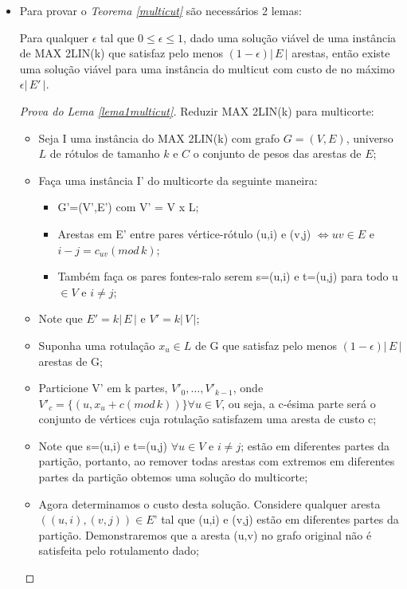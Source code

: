 \documentclass[12pt,a4paper]{article}
\begin{document}
\begin{itemize}
     \item Para provar o \emph{Teorema \ref{multicut}} são necessários 2 lemas:
    \begin{lema} \label{lema1multicut}
        Para qualquer $\epsilon$ tal que $0 \le \epsilon \le 1$, dado uma solução viável de uma instância de  MAX 2LIN(k) que satisfaz pelo menos $(1-\epsilon)|\,E\,|$ arestas, então existe uma solução viável para uma instância do multicut com custo de no máximo $\epsilon|\,E'\,|$.
    \end{lema}
    \begin{proof}[Prova do Lema \ref{lema1multicut}]
        Reduzir MAX 2LIN(k) para multicorte:
        \begin{itemize}
            \item Seja I uma instância do MAX 2LIN(k) com grafo $G=(V,E)$, universo $L$ de rótulos de tamanho $k$ e $C$ o conjunto de pesos das arestas de $E$;
            \item Faça uma instância I' do multicorte da seguinte maneira: 
            \begin{itemize}
                \item G'=(V',E') com V' = V x L;
                \item Arestas em E' entre pares vértice-rótulo (u,i) e (v,j) $\iff uv \in E$ e $i-j=c_{uv}(mod\,k)$;
                \item Também faça os pares fontes-ralo serem s=(u,i) e t=(u,j) para todo u $\in V$ e $i \ne j$;
            \end{itemize}
            \item Note que $E'=k|\,E\,|$ e $V'=k|\,V\,|$;
            \item Suponha uma rotulação $x_u \in L$ de G que satisfaz pelo menos $(1-\epsilon)|\,E\,|$ arestas de G;
            \item Particione V' em k partes, $V'_0,\dots,V'_{k-1}$, onde $V'_c=\{(u,x_u+c(mod\,k))\} \forall u \in V$, ou seja, a c-ésima parte será o conjunto de vértices cuja rotulação satisfazem uma aresta de custo c;          \item Note que s=(u,i) e t=(u,j) $\forall u\in V$ e $i \ne j$; estão em diferentes partes da partição, portanto, ao remover todas arestas com extremos em diferentes partes da partição obtemos uma solução do multicorte;
            \item Agora determinamos o custo desta solução. Considere qualquer aresta $((u,i),(v,j)) \in E’$ tal que (u,i) e (v,j) estão em diferentes partes da partição. Demonstraremos que a aresta (u,v) no grafo original não é satisfeita pelo rotulamento dado;

\end{itemize}
\end{proof}
\end{itemize}
\end{document}
